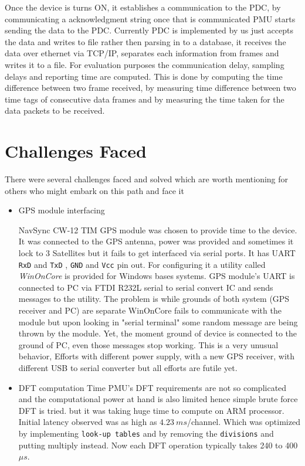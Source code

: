 Once the device is turns ON, it establishes a communication to the PDC, by communicating a acknowledgment string once that is communicated PMU starts sending the data to the PDC. Currently PDC is implemented by us just accepts the data and writes to file rather then parsing in to a database, it receives the data over ethernet via TCP/IP, separates each information from frames and writes it to a file. For evaluation purposes the communication delay, sampling delays and reporting time are computed. This is done by computing the time difference between two frame received, by measuring time difference between two time tags of consecutive data frames and by measuring the time taken for the data packets to be received. 

\section{Challenges Faced}
There were several challenges faced and solved which are worth mentioning for others who might embark on this path and face it

\begin{itemize}
	\item GPS module interfacing
	
	NavSync CW-12 TIM GPS module was chosen to provide time to the device. It was connected to the GPS antenna, power was provided and sometimes it lock to 3 Satellites but it fails to get interfaced via serial ports. It has UART \texttt{RxD} and \texttt{TxD} , \texttt{GND} and \texttt{Vcc} pin out.  For configuring it a utility called \textit{WinOnCore} is provided for Windows bases systems. GPS module's UART is connected to PC via FTDI R232L serial to serial convert IC and sends messages to the utility. The problem is while grounds of both system (GPS receiver and PC) are separate WinOnCore fails to communicate with the module but upon looking in "serial terminal" some random message are being thrown by the module. Yet, the moment ground of device is connected to the ground of PC, even those messages stop working. This is a very unusual behavior, Efforts with different power supply, with a new GPS receiver, with different USB to serial converter but all efforts are futile yet.
	
	\item DFT computation Time 
	PMU's DFT requirements are not so complicated and the computational power at hand is also limited hence simple brute force DFT is tried. but it was taking huge time to compute on ARM processor. Initial latency observed was as high as $4.23 ~ms$/channel. Which was optimized by implementing \texttt{look-up tables} and by removing the \texttt{divisions} and putting multiply instead. Now each DFT operation typically  takes 240 to 400 $\mu s$. 
	
	

\end{itemize}